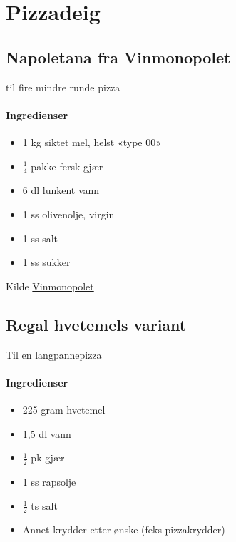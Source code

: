 \section{﻿Pizzadeig}

\subsection{Napoletana fra Vinmonopolet}
til fire mindre runde pizza
\paragraph{Ingredienser}
\begin{itemize}[noitemsep]
	\item 1 kg siktet mel, helst «type 00»
	\item $\frac{1}{4}$  pakke fersk gjær
	\item 6 dl lunkent vann
	\item 1 ss olivenolje, virgin
	\item 1 ss salt
	\item 1 ss sukker
\end{itemize}


Kilde \href{http://www.vinmonopolet.no/artikkel/mat-og-drikke/kombinasjoner-med-mat/pizza/drikke-til-pizza}{Vinmonopolet}


\subsection{Regal hvetemels variant}
Til en langpannepizza

\paragraph{Ingredienser}
\begin{itemize}[noitemsep]
	\item 225 gram hvetemel
	\item 1,5 dl vann
	\item $\frac{1}{2}$ pk gjær
	\item 1 ss rapsolje
	\item $\frac{1}{2}$ ts salt
	\item Annet krydder etter ønske (feks pizzakrydder)
\end{itemize}

